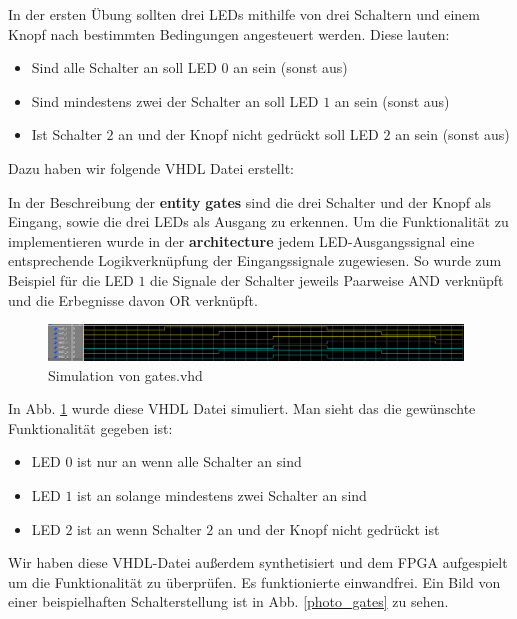 In der ersten Übung sollten drei LEDs mithilfe von drei Schaltern und einem Knopf nach bestimmten Bedingungen angesteuert werden. Diese lauten:
\begin{itemize}
    \item Sind alle Schalter an soll LED $0$ an sein (sonst aus)
    \item Sind mindestens zwei der Schalter an soll LED $1$ an sein (sonst aus)
    \item Ist Schalter $2$ an und der Knopf nicht gedrückt soll LED $2$ an sein (sonst aus)
\end{itemize}

Dazu haben wir folgende VHDL Datei erstellt:



In der Beschreibung der \textbf{entity} \textbf{gates} sind die drei Schalter und der Knopf als Eingang, sowie die drei LEDs als Ausgang zu erkennen.
Um die Funktionalität zu implementieren wurde in der \textbf{architecture} jedem LED-Ausgangssignal eine entsprechende Logikverknüpfung der Eingangssignale zugewiesen.
So wurde zum Beispiel für die LED $1$ die Signale der Schalter jeweils Paarweise AND verknüpft und die Erbegnisse davon OR verknüpft.

\begin{figure}[ht]
	\centering
    \includegraphics[width=0.98\textwidth]{../Daten/gates.png}
	\caption{Simulation von gates.vhd}
	\label{img_gates}
\end{figure}

In Abb. \ref{img_gates} wurde diese VHDL Datei simuliert.
Man sieht das die gewünschte Funktionalität gegeben ist:
\begin{itemize}
    \item LED $0$ ist nur an wenn alle Schalter an sind
    \item LED $1$ ist an solange mindestens zwei Schalter an sind
    \item LED $2$ ist an wenn Schalter $2$ an und der Knopf nicht gedrückt ist
\end{itemize}

Wir haben diese VHDL-Datei außerdem synthetisiert und dem FPGA aufgespielt um die Funktionalität zu überprüfen.
Es funktionierte einwandfrei.
Ein Bild von einer beispielhaften Schalterstellung ist in Abb. \ref{photo_gates} zu sehen.

